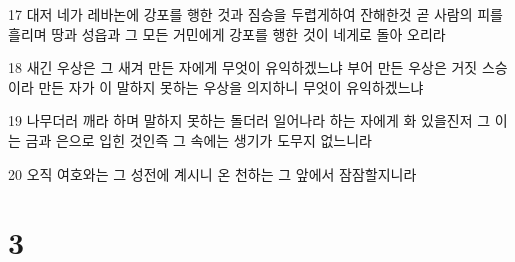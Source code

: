 \par 17 대저 네가 레바논에 강포를 행한 것과 짐승을 두렵게하여 잔해한것 곧 사람의 피를 흘리며 땅과 성읍과 그 모든 거민에게 강포를 행한 것이 네게로 돌아 오리라
\par 18 새긴 우상은 그 새겨 만든 자에게 무엇이 유익하겠느냐 부어 만든 우상은 거짓 스승이라 만든 자가 이 말하지 못하는 우상을 의지하니 무엇이 유익하겠느냐
\par 19 나무더러 깨라 하며 말하지 못하는 돌더러 일어나라 하는 자에게 화 있을진저 그 이는 금과 은으로 입힌 것인즉 그 속에는 생기가 도무지 없느니라
\par 20 오직 여호와는 그 성전에 계시니 온 천하는 그 앞에서 잠잠할지니라

\chapter{3}

